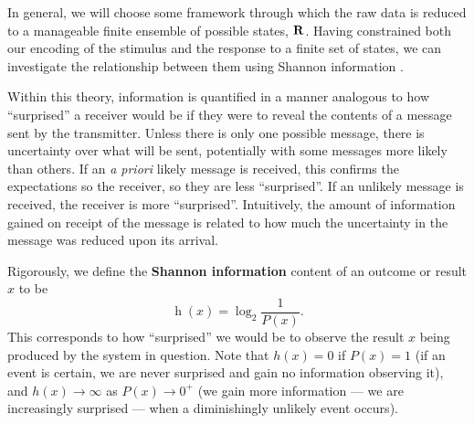 
In general, we will choose some framework through which the raw data is reduced to a manageable finite ensemble of possible states, $\mathbf{R}$.
Having constrained both our encoding of the stimulus and the response to a finite set of states, we can investigate the relationship between them using Shannon information \citep{Shannon1948}.

Within this theory, information is quantified in a manner analogous to how ``surprised'' a receiver would be if they were to reveal the contents of a message sent by the transmitter.
Unless there is only one possible message, there is uncertainty over what will be sent, potentially with some messages more likely than others.
If an \textit{a priori} likely message is received, this confirms the expectations so the receiver, so they are less ``surprised''.
If an unlikely message is received, the receiver is more ``surprised''.
Intuitively, the amount of information gained on receipt of the message is related to how much the uncertainty in the message was reduced upon its arrival.

Rigorously, we define the \textbf{Shannon information} content of an outcome or result $x$ to be
\begin{equation}
\label{eq:shannon-information}
\operatorname{h}( x ) = \log_2 \frac{1}{P(x)}
.\end{equation}
This corresponds to how ``surprised'' we would be to observe the result $x$ being produced by the system in question.
Note that $h(x)=0$ if $P(x)=1$ (if an event is certain, we are never surprised and gain no information observing it), and $h(x) \to \infty$ as $P(x) \to 0^+$ (we gain more information --- we are increasingly surprised --- when a diminishingly unlikely event occurs).

